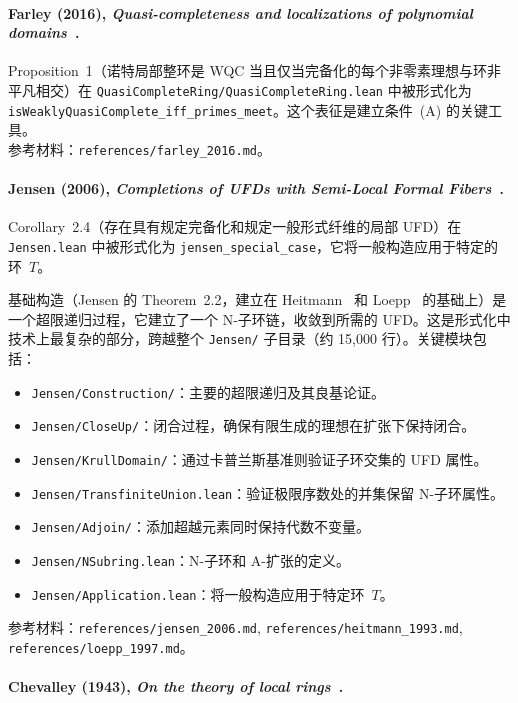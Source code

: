 ﻿\documentclass[]{pkuai4m}
\theoremstyle{plain}
\theoremstyle{definition}
\begin{document}
\paragraph{Farley (2016), \emph{Quasi-completeness and localizations of polynomial domains}~\cite{farley2016quasi}.}

Proposition~1（诺特局部整环是 WQC 当且仅当完备化的每个非零素理想与环非平凡相交）在 \texttt{QuasiCompleteRing/QuasiCompleteRing.lean} 中被形式化为 \texttt{isWeaklyQuasiComplete\_iff\_primes\_meet}。这个表征是建立条件~(A) 的关键工具。\\
参考材料：\texttt{references/farley\_2016.md}。

\paragraph{Jensen (2006), \emph{Completions of UFDs with Semi-Local Formal Fibers}~\cite{jensen2006completions}.}

Corollary~2.4（存在具有规定完备化和规定一般形式纤维的局部 UFD）在 \texttt{Jensen.lean} 中被形式化为 \texttt{jensen\_special\_case}，它将一般构造应用于特定的环~$T$。

基础构造（Jensen 的 Theorem~2.2，建立在 Heitmann~\cite{heitmann1993characterization} 和 Loepp~\cite{loepp1997constructing} 的基础上）是一个超限递归过程，它建立了一个 N-子环链，收敛到所需的 UFD。这是形式化中技术上最复杂的部分，跨越整个 \texttt{Jensen/} 子目录（约 15,000 行）。关键模块包括：
\begin{itemize}
\item \texttt{Jensen/Construction/}：主要的超限递归及其良基论证。
\item \texttt{Jensen/CloseUp/}：闭合过程，确保有限生成的理想在扩张下保持闭合。
\item \texttt{Jensen/KrullDomain/}：通过卡普兰斯基准则验证子环交集的 UFD 属性。
\item \texttt{Jensen/TransfiniteUnion.lean}：验证极限序数处的并集保留 N-子环属性。
\item \texttt{Jensen/Adjoin/}：添加超越元素同时保持代数不变量。
\item \texttt{Jensen/NSubring.lean}：N-子环和 A-扩张的定义。
\item \texttt{Jensen/Application.lean}：将一般构造应用于特定环~$T$。
\end{itemize}
参考材料：\texttt{references/jensen\_2006.md}, \texttt{references/heitmann\_1993.md}, \texttt{references/loepp\_1997.md}。

\paragraph{Chevalley (1943), \emph{On the theory of local rings}~\cite{chevalley1943theory}.}
\end{document}
